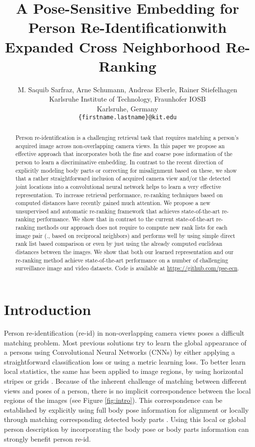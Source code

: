 \documentclass[10pt,twocolumn,letterpaper]{article}
\title{A Pose-Sensitive Embedding for Person Re-Identification\linebreak with Expanded Cross Neighborhood Re-Ranking}
\author{M. Saquib Sarfraz, Arne Schumann, Andreas Eberle, Rainer Stiefelhagen\\
Karlsruhe Institute of Technology, Fraunhofer IOSB\\
Karlsruhe, Germany\\
{\tt\small  \{firstname.lastname\}@kit.edu}}
\begin{document}
\maketitle


\begin{abstract}
Person re-identification is a challenging retrieval task that requires matching a person's acquired image across non-overlapping camera views. In this paper we propose an effective approach that incorporates both the fine and coarse pose information of the person to learn a discriminative embedding. In contrast to the recent direction of explicitly modeling body parts or correcting for misalignment based on these, we show that a rather straightforward inclusion of acquired camera view and/or the detected joint locations into a convolutional neural network helps to learn a very effective representation. To increase retrieval performance, re-ranking techniques based on computed distances have recently gained much attention. We propose a new unsupervised and automatic re-ranking framework that achieves state-of-the-art re-ranking performance. We show that in contrast to the current state-of-the-art re-ranking methods our approach does not require to compute new rank lists for each image pair (\eg., based on reciprocal neighbors) and performs well by using simple direct rank list based comparison or even by just using the already computed euclidean distances between the images. We show that both our learned representation and our re-ranking method achieve state-of-the-art performance on a number of challenging surveillance image and video datasets. 
Code is available at \url{https://github.com/pse-ecn}.
\vspace{-.5cm}
\end{abstract} \section{Introduction}
\label{sec:intro}
Person re-identification (re-id) in non-overlapping camera views poses a difficult matching problem. Most previous solutions try to learn the global appearance of a persons using Convolutional Neural Networks (CNNs) by either applying a straightforward classification loss or using a metric learning loss. To better learn local statistics, the same has been applied to image regions, \eg by using horizontal stripes or grids \cite{li2014deepreid, cheng2016person}. Because of the inherent challenge of matching between different views and poses of a person, there is no implicit correspondence between the local regions of the images (see Figure \ref{fig:intro}). This correspondence can be established by explicitly using full body pose information for alignment \cite{su2017pose} or locally through matching corresponding detected body parts \cite{zhao2017spindle,zhao2017deeply}. Using this local or global person description by incorporating the body pose or body parts information can strongly benefit person re-id.
\end{document}
